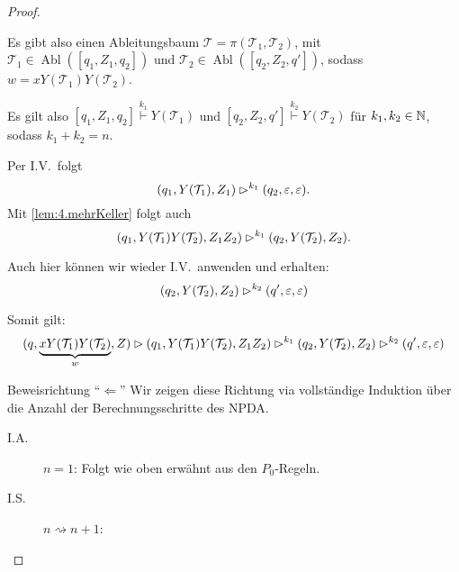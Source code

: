 \begin{proof}
\begin{itemize}
\begin{description}
\begin{itemize}
      Es gibt also einen Ableitungsbaum $\mathcal{T} = \pi(\mathcal{T}_1,\mathcal{T}_2)$, mit $\mathcal{T}_1 \in \operatorname{Abl}([q_1, Z_1, q_2])$ und $\mathcal{T}_2 \in \operatorname{Abl}([q_2, Z_2, q'])$, sodass $w = xY(\mathcal{T}_1)Y(\mathcal{T}_2)$.
      
      Es gilt also $[q_1, Z_1, q_2]\stackrel{k_1}{\vdash} Y(\mathcal{T}_1)$ und 
      $[q_2, Z_2, q']\stackrel{k_2}{\vdash} Y(\mathcal{T}_2)$ für $k_1,k_2\in\mathbb{N}$, sodass $k_1+k_2=n$.
      
          Per I.V.\ folgt
          \begin{displaymath}
            (q_1, Y(\mathcal{T}_1), Z_1) \rhd^{k_1} (q_2, \varepsilon, \varepsilon).
          \end{displaymath}
          Mit \autoref{lem:4.mehrKeller} folgt auch
          \begin{displaymath}
            (q_1, Y(\mathcal{T}_1)Y(\mathcal{T}_2), Z_1Z_2) \rhd^{k_1} (q_2, Y(\mathcal{T}_2), Z_2).
          \end{displaymath}
          

      Auch hier können wir wieder I.V.\ anwenden und erhalten:
          \begin{displaymath}
            (q_2, Y(\mathcal{T}_2), Z_2) \rhd^{k_2} (q', \varepsilon, \varepsilon)
          \end{displaymath}
          
                    Somit gilt:
          \begin{displaymath}
            (q, \underbrace{xY(\mathcal{T}_1)Y(\mathcal{T}_2)}_{w}, Z) \rhd (q_1, Y(\mathcal{T}_1)Y(\mathcal{T}_2), Z_1Z_2) \rhd^{k_1} (q_2, Y(\mathcal{T}_2), Z_2) \rhd^{k_2} (q', \varepsilon, \varepsilon)
          \end{displaymath}
      \end{itemize}
      
     \end{description}

    \end{itemize}
    
    \item Beweisrichtung "`$\Leftarrow$"'
     Wir zeigen diese Richtung via vollständige Induktion über die Anzahl der Berechnungsschritte des \ac{NPDA}.
     \begin{description}
      \item[I.A.] $n=1$: Folgt wie oben erwähnt aus den $P_0$-Regeln.
      \item[I.S.] $n\rightsquigarrow n+1$:
      

\end{description}
\end{proof}
